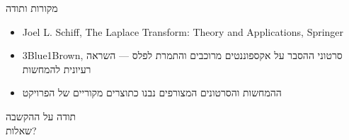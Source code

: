 \documentclass[aspectratio=169,11pt]{beamer}
\begin{document}
\begin{frame}{מקורות ותודה}
\begin{itemize}
\setlength{\itemsep}{10pt}
\item \textenglish{Joel L. Schiff}, \textenglish{The Laplace Transform: Theory and Applications}, Springer
\item \textenglish{3Blue1Brown}, סרטוני ההסבר על אקספוננטים מרוכבים והתמרת לפלס — השראה רעיונית להמחשות
\item ההמחשות והסרטונים המצורפים נבנו כתוצרים מקוריים של הפרויקט
\end{itemize}
\vspace{9mm}
\begin{center}
{\Huge\color{cyan}תודה על ההקשבה}\\[4mm]
{\LARGE\color{gold}שאלות?}
\end{center}
\end{frame}
\end{document}
